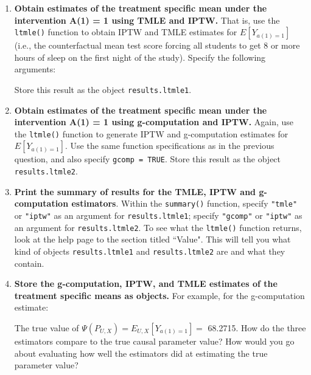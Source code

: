 \documentclass[answers]{exam}
\newenvironment{packed_item}{
\begin{itemize}
 \setlength{\itemsep}{0pt}
  \setlength{\parskip}{0pt}
  \setlength{\parsep}{0pt}
}{\end{itemize}}
\begin{document}
\begin{enumerate}
\item \textbf{Obtain estimates of the treatment specific mean under the intervention A(1) = 1 using TMLE and IPTW.} That is, use the \texttt{ltmle()} function to obtain IPTW and TMLE estimates for $E[Y_{a(1)=1}]$ (i.e., the counterfactual mean test score forcing all students to get 8 or more hours of sleep on the first night of the study). Specify the following arguments:
Store this result as the object \texttt{results.ltmle1}.
\item \textbf{Obtain estimates of the treatment specific mean under the intervention A(1) = 1 using g-computation and IPTW.} Again, use the \texttt{ltmle()} function to generate IPTW and g-computation estimates for $E[Y_{a(1)=1}]$. Use the same function specifications as in the previous question, and also specify \texttt{gcomp = TRUE}. Store this result as the object \texttt{results.ltmle2}.
\item \textbf{Print the summary of results for the TMLE, IPTW and g-computation estimators}. Within the \texttt{summary()} function, specify \texttt{"tmle"} or \texttt{"iptw"} as an argument for \texttt{results.ltmle1}; specify \texttt{"gcomp"} or \texttt{"iptw"} as an argument for \texttt{results.ltmle2}. To see what the \texttt{ltmle()} function returns, look at the help page to the section titled ``Value". This will tell you what kind of objects \texttt{results.ltmle1} and \texttt{results.ltmle2} are and what they contain.
\item \textbf{Store the g-computation, IPTW, and TMLE estimates of the treatment specific means as objects.} For example, for the g-computation estimate:
\begin{Schunk}
\end{Schunk}


The true value of $\Psi(P_{U,X}) = E_{U,X}[Y_{a(1)=1}] = $ 68.2715. How do the three estimators compare to the true causal parameter value? How would you go about evaluating how well the estimators did at estimating the true parameter value?
\end{enumerate}
\end{document}

